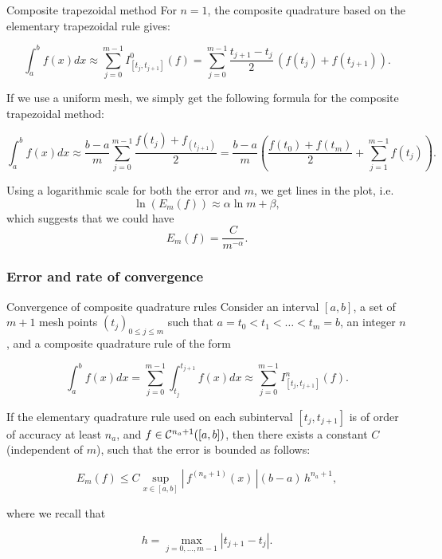 \documentclass{article}
\begin{document}
    \vspace{10pt}

    \begin{other}{Composite trapezoidal method}
        For $n=1$, the composite quadrature based on the elementary trapezoidal rule gives:

        $$
        \int_a^b f(x)dx  \approx \sum_{j=0}^{m-1} I^0_{[t_j,t_{j+1}]}(f) = \sum_{j=0}^{m-1} \frac{t_{j+1}-t_j}{2}\,(f(t_j)+f(t_{j+1})).
        $$
        
        If we use a uniform mesh, we simply get the following formula for the composite trapezoidal method:
        
        $$
        \int_a^b f(x)dx  \approx \frac{b-a}{m}\sum_{j=0}^{m-1} \frac{f(t_j)+f_(t_{j+1})}{2} = \frac{b-a}{m}\left(\frac{f(t_0)+f(t_{m})}{2} + \sum_{j=1}^{m-1} f(t_j) \right) .
        $$
    \end{other}

    \vspace{10pt}

    \begin{remark}
        Using a logarithmic scale for both the error and $m$, we get lines in the plot, i.e.
        $$
        \ln (E_m(f)) \approx \alpha \ln m + \beta,
        $$
        which suggests that we could have
        $$
        E_m(f) = \frac{C}{m^{-\alpha}}.
        $$
    \end{remark}

    \subsubsection{Error and rate of convergence}

    \begin{theorem}{Convergence of composite quadrature rules}
        Consider an interval $[a,b]$, a set of $m+1$ mesh points $(t_j)_{0\leq j\leq m}$ such that $a = t_0 < t_1 < \ldots < t_m = b$, an integer $n$, and a composite quadrature rule of the form 
        
        $$
        \int_a^b f(x)dx = \sum_{j=0}^{m-1} \int_{t_j}^{t_{j+1}} f(x)dx  \approx \sum_{j=0}^{m-1} I^n_{[t_j,t_{j+1}]}(f).
        $$
        
        If the elementary quadrature rule used on each subinterval $[t_j,t_{j+1}]$ is of order of accuracy at least $n_a$, and $f\in{\cal C}^{n_a+1}([a,b])$, then there exists a constant $C$ (independent of $m$), such that the error is bounded as follows:
        
        $$
        E_m(f) \leq C \sup_{x\in [a,b]} \left\vert \,f^{(n_a+1)}(x)\,\right\vert (b-a) \, h^{n_a+1},
        $$
        
        where we recall that 
        
        $$h = \max_{j=0,\ldots,m-1} \left\vert t_{j+1} - t_j \right\vert.$$
    \end{theorem}
\end{document}
